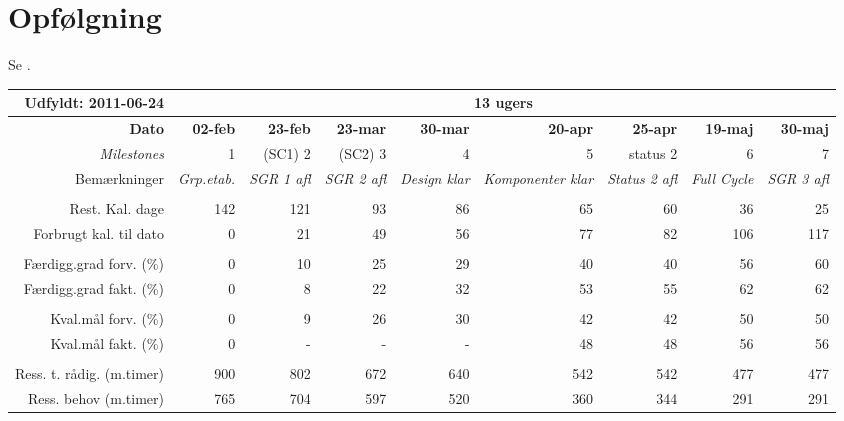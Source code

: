 \section{Opfølgning}
Se .
\begin{sidewaystable}[!htbp]
\begin{footnotesize}
    \begin{tabular}{r|rrrrrrrr}
Udfyldt: 2011-06-24    & \multicolumn{8}{c}{13 ugers} \\ \hline
    \textbf{Dato} & \textbf{02-feb} & \textbf{23-feb} & \textbf{23-mar} & \textbf{30-mar} & \textbf{20-apr} & \textbf{25-apr} & \textbf{19-maj} & \textbf{30-maj} \\
    \textit{Milestones} & 1     & (SC1) 2 & (SC2) 3 & 4     & 5     & status 2 & 6     & 7 \\
    Bemærkninger & \textit{Grp.etab.} & \multicolumn{1}{l}{\textit{SGR 1 afl}} & \multicolumn{1}{l}{\textit{SGR 2 afl}} & \textit{Design klar} & \textit{Komponenter klar} & \textit{Status 2 afl} & \textit{Full Cycle} & \multicolumn{1}{l}{\textit{SGR 3 afl}} \\
          &       &       &       &       &       &       &       & \\
    Rest. Kal. dage & 142   & 121   & 93    & 86    & 65    & 60    & 36    & 25 \\
    Forbrugt kal. til dato & 0     & 21    & 49    & 56    & 77    & 82    & 106    & 117 \\
          &       &       &       &       &       &       &       & \\
    Færdigg.grad forv. (\%) & 0     & 10    & 25    & 29    & 40    & 40    & 56    & 60 \\
    Færdigg.grad fakt. (\%) & 0     & 8     & 22    & 32    & 53    & 55    & 62    & 62 \\
          &       &       &       &       &       &       &       & \\
    Kval.mål forv. (\%) & 0     & 9    & 26    & 30    & 42    & 42    & 50    & 50 \\
    Kval.mål fakt. (\%) & 0     & -   & -   & -   & 48  & 48    & 56    & 56 \\
          &       &       &       &       &       &       &       & \\
    Ress. t. rådig. (m.timer) & 900   & 802   & 672   & 640   & 542   & 542   & 477   & 477 \\
    Ress. behov (m.timer) & 765   & 704 & 597 & 520   & 360   & 344   & 291   & 291 \\

\end{tabular}
\end{footnotesize}
\end{sidewaystable}
